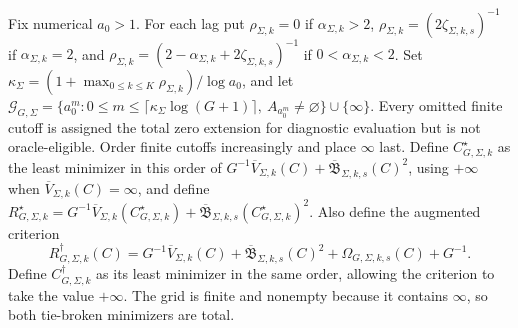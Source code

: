 Fix numerical \(a_0>1\). For each lag put \(\rho_{\Sigma,k}=0\) if \(\alpha_{\Sigma,k}>2\), \(\rho_{\Sigma,k}=(2\zeta_{\Sigma,k,s})^{-1}\) if \(\alpha_{\Sigma,k}=2\), and \(\rho_{\Sigma,k}=(2-\alpha_{\Sigma,k}+2\zeta_{\Sigma,k,s})^{-1}\) if \(0<\alpha_{\Sigma,k}<2\). Set \(\kappa_\Sigma=(1+\max_{0\le k\le K}\rho_{\Sigma,k})/\log a_0\), and let \(\mathcal G_{G,\Sigma}=\{a_0^m:0\le m\le\lceil\kappa_\Sigma\log(G+1)\rceil,\ A_{a_0^m}\ne\varnothing\}\cup\{\infty\}\). Every omitted finite cutoff is assigned the total zero extension for diagnostic evaluation but is not oracle-eligible. Order finite cutoffs increasingly and place \(\infty\) last. Define \(C_{G,\Sigma,k}^{\star}\) as the least minimizer in this order of \(G^{-1}\overline V_{\Sigma,k}(C)+\overline{\mathfrak B}_{\Sigma,k,s}(C)^2\), using \(+\infty\) when \(\overline V_{\Sigma,k}(C)=\infty\), and define \(R_{G,\Sigma,k}^{\star}=G^{-1}\overline V_{\Sigma,k}(C_{G,\Sigma,k}^{\star})+\overline{\mathfrak B}_{\Sigma,k,s}(C_{G,\Sigma,k}^{\star})^2\). Also define the augmented criterion \[R_{G,\Sigma,k}^{\dagger}(C)=G^{-1}\overline V_{\Sigma,k}(C)+\overline{\mathfrak B}_{\Sigma,k,s}(C)^2+\Omega_{G,\Sigma,k,s}(C)+G^{-1}.\] Define \(C_{G,\Sigma,k}^{\dagger}\) as its least minimizer in the same order, allowing the criterion to take the value \(+\infty\). The grid is finite and nonempty because it contains \(\infty\), so both tie-broken minimizers are total.